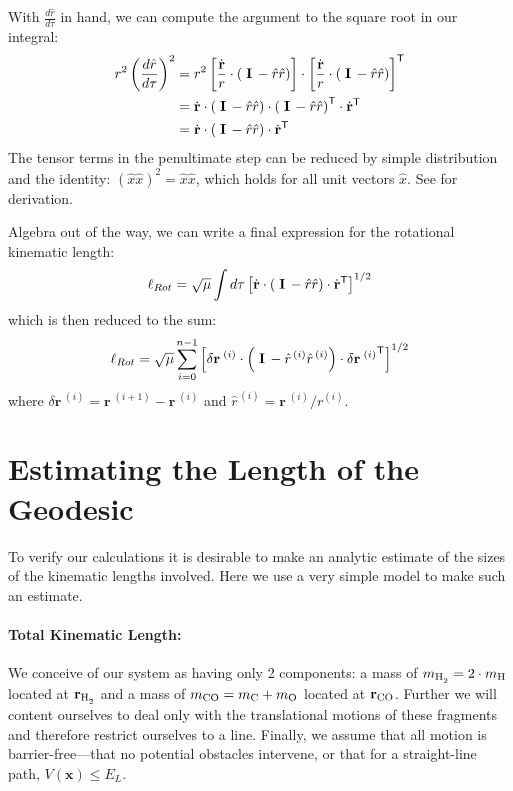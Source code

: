 \documentclass[letterpaper,12pt]{article}
\renewcommand{\vec}[1]{\mathbf{#1}}
\newcommand{\mat}[1]{\;\textrm{\textbf{#1}}\,}
\newcommand{\trans}[1]{{#1}^{\mathsf{T}}}
\begin{document}
With $\frac{d\hat{r}}{d\tau}$ in hand, we can compute the argument to the square root in our integral:
\begin{align}
r^{2} \left( \frac{d\hat{r}}{d\tau} \right) ^2 &= r^2 \left[ \frac{\dot{\vec{r}}}{r} \cdot \left( \mat{I} - \hat{r}\hat{r} \right) \right] \cdot \trans{\left[ \frac{\dot{\vec{r}}}{r} \cdot \left( \mat{I} - \hat{r}\hat{r} \right) \right]} \\
&= \dot{\vec{r}} \cdot \left( \mat{I} - \hat{r}\hat{r} \right) \cdot \trans{\left( \mat{I} - \hat{r}\hat{r} \right)} \cdot \trans{\dot{\vec{r}}} \\
&= \dot{\vec{r}} \cdot \left( \mat{I} - \hat{r}\hat{r} \right)  \cdot \trans{\dot{\vec{r}}}
\end{align}
The tensor terms in the penultimate step can be reduced by simple distribution and the identity: $(\hat{x}\hat{x})^2 = \hat{x}\hat{x}$, which holds for all unit vectors $\hat{x}$. See \cite[2014.05.22:148]{dvcs:labbook1} for derivation.

Algebra out of the way, we can write a final expression for the rotational kinematic length:
\begin{equation}
\ell_{Rot} = \sqrt{\mu} \int d\tau \left[ \dot{\vec{r}} \cdot \left( \mat{I} - \hat{r}\hat{r} \right) \cdot \trans{\dot{\vec{r}}} \right]^{1/2}
\end{equation}
which is then reduced to the sum:
\begin{equation}
\ell_{Rot} = \sqrt{\mu} \sum_{i=0}^{n-1}  \left[ \delta\vec{r}^{\;(i)} \cdot \left( \mat{I} - \hat{r}^{\,(i)}\hat{r}^{\,(i)} \right) \cdot \trans{\delta\vec{r}^{\;(i)}}\right]^{1/2}
\end{equation}
where  $\delta \vec{r}^{\;(i)} = \vec{r}^{\;(i+1)} - \vec{r}^{\;(i)}$ and $\hat{r}^{\,(i)} = \vec{r}^{\;(i)} / r^{(i)}$. 

\section{Estimating the Length of the Geodesic}
To verify our calculations it is desirable to make an analytic estimate of the sizes of the kinematic lengths involved. Here we use a very simple model to make such an estimate.

\newcommand{\co}{_{\ce{CO}}}
\newcommand{\hh}{_{\ce{H2}}}
\newcommand{\hhco}{_{\ce{H2}-\ce{CO}}}

\paragraph{Total Kinematic Length:}
We conceive of our system as having only 2 components: a mass of $m\hh = 2\cdot m_{\ce{H}}$ located at $\vec{r}\hh$ and a mass of $m\co = m_{\ce{C}} + m_{\ce{O}}$ located at $\vec{r}\co$. Further we will content ourselves to deal only with the translational motions of these fragments and therefore restrict ourselves to a line. Finally, we assume that all motion is barrier-free---that no potential obstacles intervene, or that for a straight-line path,  $V(\vec{x}) \le E_L$.
\end{document}
